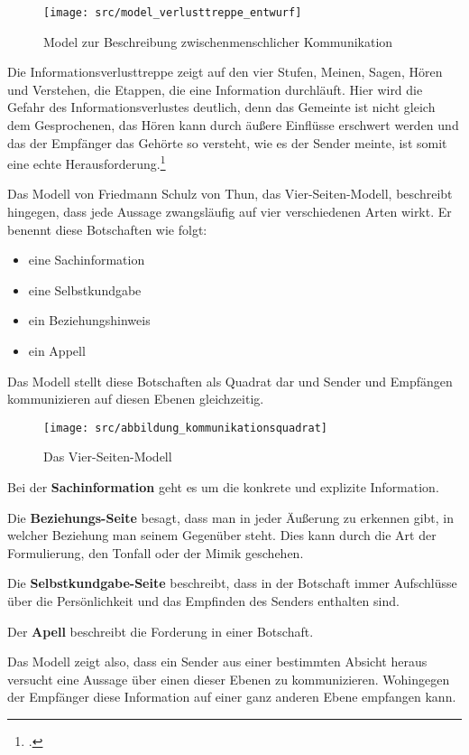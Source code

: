 \documentclass[12pt, DIV9, BCOR9mm, onecolumn, headsepline, ngerman]{scrreprt}
\begin{document}
\begin{figure}[htbp]
\caption{Model zur Beschreibung zwischenmenschlicher Kommunikation}
\centering
\texttt{[image: src/model\_verlusttreppe\_entwurf]}
\end{figure}

Die Informationsverlusttreppe zeigt auf den vier Stufen, Meinen, Sagen, Hören und Verstehen, die Etappen, die eine Information durchläuft. Hier wird die Gefahr des Informationsverlustes deutlich, denn das Gemeinte ist nicht gleich dem Gesprochenen, das Hören kann durch äußere Einflüsse erschwert werden und das der Empfänger das Gehörte so versteht, wie es der Sender meinte, ist somit eine echte Herausforderung.\footcite[vgl.][S.33f]{GehmKommunikation}

Das Modell von Friedmann Schulz von Thun, das Vier-Seiten-Modell, beschreibt hingegen, dass jede Aussage zwangsläufig auf vier verschiedenen Arten wirkt. Er benennt diese Botschaften wie folgt:
\begin{itemize}
\item eine Sachinformation
\item eine Selbstkundgabe
\item ein Beziehungshinweis
\item ein Appell
\end{itemize}

Das Modell stellt diese Botschaften als Quadrat dar und Sender und Empfängen kommunizieren auf diesen Ebenen gleichzeitig.

\begin{figure}[htbp]
\caption{Das Vier-Seiten-Modell}
\centering
\texttt{[image: src/abbildung\_kommunikationsquadrat]}
\end{figure}


Bei der \textbf{Sachinformation} geht es um die konkrete und explizite Information.

Die \textbf{Beziehungs-Seite} besagt, dass man in jeder Äußerung zu erkennen gibt, in welcher Beziehung man seinem  Gegenüber steht. Dies kann durch die Art der Formulierung, den Tonfall oder der Mimik geschehen.

Die \textbf{Selbstkundgabe-Seite} beschreibt, dass in der Botschaft immer Aufschlüsse über die Persönlichkeit und das Empfinden des Senders enthalten sind.

Der \textbf{Apell} beschreibt die Forderung in einer Botschaft.

Das Modell zeigt also, dass ein Sender aus einer bestimmten Absicht heraus versucht eine Aussage über einen dieser Ebenen zu kommunizieren. Wohingegen der Empfänger   diese Information auf einer ganz anderen Ebene empfangen kann.
\end{document}
